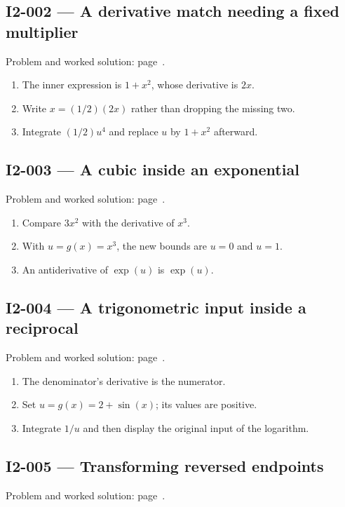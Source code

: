 \documentclass[11pt,oneside,openany]{book}
\begin{document}
\subsection*{I2-002 --- A derivative match needing a fixed multiplier}
\label{hints:I2-002}
Problem and worked solution: page~\pageref{problem:I2-002}.

\begin{enumerate}
\item The inner expression is \(1+x^2\), whose derivative is \(2x\).
\item Write \(x=(1/2)(2x)\) rather than dropping the missing two.
\item Integrate \((1/2)u^4\) and replace \(u\) by \(1+x^2\) afterward.
\end{enumerate}
\subsection*{I2-003 --- A cubic inside an exponential}
\label{hints:I2-003}
Problem and worked solution: page~\pageref{problem:I2-003}.

\begin{enumerate}
\item Compare \(3x^2\) with the derivative of \(x^3\).
\item With \(u=g(x)=x^3\), the new bounds are \(u=0\) and \(u=1\).
\item An antiderivative of \(\exp(u)\) is \(\exp(u)\).
\end{enumerate}
\subsection*{I2-004 --- A trigonometric input inside a reciprocal}
\label{hints:I2-004}
Problem and worked solution: page~\pageref{problem:I2-004}.

\begin{enumerate}
\item The denominator's derivative is the numerator.
\item Set \(u=g(x)=2+\sin(x)\); its values are positive.
\item Integrate \(1/u\) and then display the original input of the logarithm.
\end{enumerate}
\subsection*{I2-005 --- Transforming reversed endpoints}
\label{hints:I2-005}
Problem and worked solution: page~\pageref{problem:I2-005}.
\end{document}
